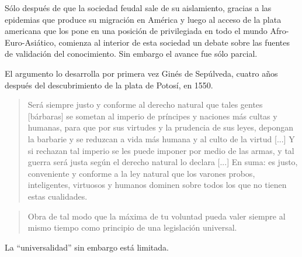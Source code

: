 \documentclass[a4paper,10pt]{book}
\newif\ifen
\newif\ifes
\newcommand{\en}[1]{\ifen#1\fi}
\newcommand{\es}[1]{\ifes#1\fi}
\begin{document}
Sólo después de que la sociedad feudal sale de su aislamiento, gracias a las epidemias que produce su migración en América y luego al acceso de la plata americana que los pone en una posición de privilegiada en todo el mundo Afro-Euro-Asiático, comienza al interior de esta sociedad un debate sobre las fuentes de validación del conocimiento.
%
\en{}%
\es{En esta etapa el criterio de experiencia personal comenzó ganar terreno como fundamento del ``saber auténtico'' sobre los criterios de autoridad.}%
%
Sin embargo el avance fue sólo parcial.
%
\es{Este criterio que fue utilizado para democratizar el conocimiento al interior de la sociedad feudal en el nuevo contexto, sin embargo se reservan para uso exclusivo de sus miembros varones.}
%
\es{El argumento de la superioridad moral sigue siendo usando como justificación de dominación colonial-patriarcal, y se continua en la actualidad como imposición de la jurisdicción estatal sobre las comunidades locales.}
%
El argumento lo desarrolla por primera vez Ginés de Sepúlveda, cuatro años después del descubrimiento de la plata de Potosí, en 1550.%
%
\begin{quotation}
 Será siempre justo y conforme al derecho natural que tales gentes [bárbaras] se sometan al imperio de príncipes y naciones más cultas y humanas, para que por sus virtudes y la prudencia de sus leyes, depongan la barbarie y se reduzcan a vida más humana y al culto de la virtud [...] Y si rechazan tal imperio se les puede imponer por medio de las armas, y tal guerra será justa según el derecho natural lo declara [...] En suma: es justo, conveniente y conforme a la ley natural que los varones probos, inteligentes, virtuosos y humanos dominen sobre todos los que no tienen estas cualidades\cite{GinesdeSepulveda1967p87}.
\end{quotation}
%
\es{Este argumento se impondrá a pesar de que avanzado el proceso colonial-moderno, a partir de Kant, se llegue al consenso de que la fuente de validez del conocimiento se fundamenta en la norma conocida como el imperativo categórico,}%
%
\begin{quotation}
Obra de tal modo que la máxima de tu voluntad pueda valer siempre al mismo tiempo como principio de una legislación universal. \cite{Kant2003:28}
\end{quotation}
%
La ``universalidad'' sin embargo está limitada.
%
\es{Mujeres, extranjeros, animales y sistemas ecológicos completos sólo participan como objetos de los varones-blancos, estos últimos únicos sujetos con valor universal.}%
%
\es{La sociedad colonial-moderna, y su ciencia, repite la estructura verticalista y punitivista de la sociedad feudal ahora con alcance global gracias a la plata Americana.}%
\end{document}
